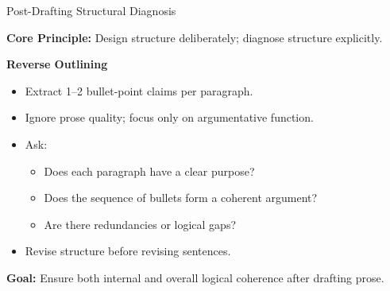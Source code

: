 \documentclass{beamer}
\begin{document}
\begin{frame}{Post-Drafting Structural Diagnosis}

\begin{block}{\textbf{Core Principle:}}
    Design structure deliberately; diagnose structure explicitly.
\end{block}

\textbf{Reverse Outlining}
\begin{itemize}
    \item Extract 1–2 bullet-point claims per paragraph.
    \item Ignore prose quality; focus only on argumentative function.
    \item Ask:
    \begin{itemize}
        \item Does each paragraph have a clear purpose?
        \item Does the sequence of bullets form a coherent argument?
        \item Are there redundancies or logical gaps?
    \end{itemize}
    \item Revise structure before revising sentences.
\end{itemize}

\textbf{Goal:}
Ensure both internal and overall logical coherence after drafting prose.

\end{frame}
\end{document}

